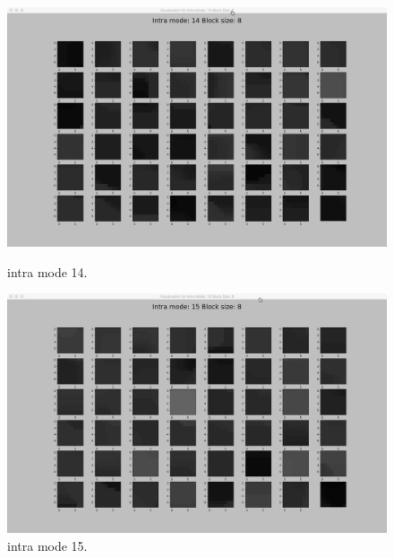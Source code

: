 \begin{figure}[H]
    \begin{minipage}{0.49\textwidth}
        \includegraphics[width=\linewidth]{Figures/visu-size8x8/8-14}
        \caption[Intra mode 14]{intra mode 14.}
        \label{fig:size8_mode14}
    \end{minipage}
    \hspace{\fill} %
    \begin{minipage}{0.49\textwidth}
        \includegraphics[width=\linewidth]{Figures/visu-size8x8/8-15}
        \caption[Intra mode 15]{intra mode 15.}
        \label{fig:size8_mode15}
    \end{minipage}
\end{figure}

